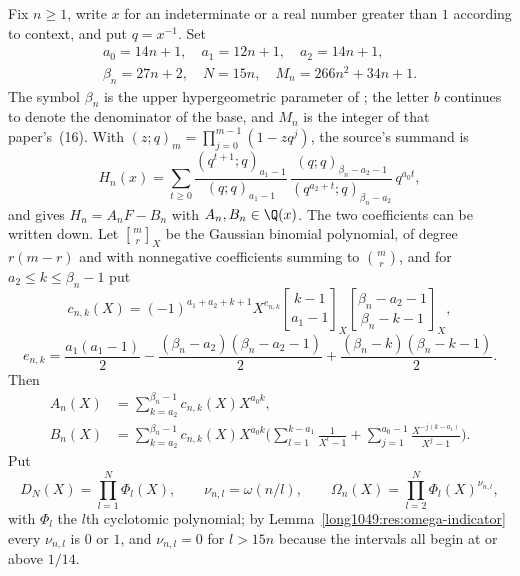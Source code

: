 Fix $n\ge1$, write $x$ for an indeterminate or a real number greater than $1$
according to context, and put $q=x^{-1}$.  Set
\[
\begin{gathered}
 a_0=14n+1,\quad a_1=12n+1,\quad a_2=14n+1,\\
 \beta_n=27n+2,\quad N=15n,\quad M_n=266n^{2}+34n+1 .
\end{gathered}
\]
The symbol $\beta_n$ is the upper hypergeometric parameter of
\cite[Sec.~2]{zudilin2004}; the letter $b$ continues to denote the denominator
of the base, and $M_n$ is the integer of that paper's~(16).  With
$(z;q)_m=\prod_{j=0}^{m-1}(1-zq^{j})$, the source's summand is
\begin{equation}\label{long1049:eq:positive-source-form}
 H_n(x)=\sum_{t\ge0}
 \frac{(q^{t+1};q)_{a_1-1}}{(q;q)_{a_1-1}}\,
 \frac{(q;q)_{\beta_n-a_2-1}}{(q^{a_2+t};q)_{\beta_n-a_2}}\,q^{a_0t},
\end{equation}
and \cite[(8)--(11)]{zudilin2004} gives $H_n=A_nF-B_n$ with
$A_n,B_n\in\Q(x)$.  The two coefficients can be written down.  Let
$\genfrac{[}{]}{0pt}{}{m}{r}_X$ be the Gaussian binomial polynomial, of degree
$r(m-r)$ and with nonnegative coefficients summing to $\binom{m}{r}$, and for
$a_2\le k\le\beta_n-1$ put
\begin{equation}\label{long1049:eq:c-explicit}
 c_{n,k}(X)=(-1)^{a_1+a_2+k+1}X^{e_{n,k}}
 \genfrac{[}{]}{0pt}{}{k-1}{a_1-1}_X
 \genfrac{[}{]}{0pt}{}{\beta_n-a_2-1}{\beta_n-k-1}_X,
\end{equation}
\[
 e_{n,k}=\frac{a_1(a_1-1)}2-\frac{(\beta_n-a_2)(\beta_n-a_2-1)}2
 +\frac{(\beta_n-k)(\beta_n-k-1)}2 .
\]
Then
\begin{align}
 A_n(X)&=\sum_{k=a_2}^{\beta_n-1}c_{n,k}(X)X^{a_0k},\label{long1049:eq:A-explicit}\\
 B_n(X)&=\sum_{k=a_2}^{\beta_n-1}c_{n,k}(X)X^{a_0k}
 \biggl(\sum_{l=1}^{k-a_1}\frac1{X^{l}-1}
 +\sum_{j=1}^{a_0-1}\frac{X^{-j(k-a_1)}}{X^{j}-1}\biggr).\label{long1049:eq:B-explicit}
\end{align}
Put
\begin{equation}\label{long1049:eq:cyclotomic-products}
 D_N(X)=\prod_{l=1}^{N}\Phi_l(X),\qquad
 \nu_{n,l}=\omega(n/l),\qquad
 \Omega_n(X)=\prod_{l=2}^{N}\Phi_l(X)^{\nu_{n,l}},
\end{equation}
with $\Phi_l$ the $l$th cyclotomic polynomial; by
Lemma~\ref{long1049:res:omega-indicator} every $\nu_{n,l}$ is $0$ or $1$, and
$\nu_{n,l}=0$ for $l>15n$ because the intervals all begin at or above $1/14$.

